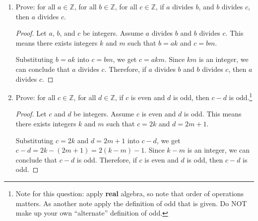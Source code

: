 \documentclass{article}
\begin{document}
\begin{enumerate}
\newpage

\item Prove: for all $a \in \mathbb{Z}$, for all $b \in \mathbb{Z}$, for all $c \in \mathbb{Z}$, if $a$ divides $b$, and $b$ divides $c$, then $a$ divides $c$.

\begin{proof}
    Let $a$, $b$, and $c$ be integers. Assume $a$ divides $b$ and $b$ divides $c$. This means there exists integers $k$ and $m$ such that $b = ak$ and $c = bm$.

    Substituting $b = ak$ into $c = bm$, we get $c = akm$. Since $km$ is an integer, we can conclude that $a$ divides $c$. Therefore, if $a$ divides $b$ and $b$ divides $c$, then $a$ divides $c$.
\end{proof}

\newpage

\item Prove: for all $c \in \mathbb{Z}$, for all $d \in \mathbb{Z}$, if $c$ is even and $d$ is odd, then $c-d$ is odd.\footnote{Note for this question: apply {\bf real} algebra, so note that order of operations matters. As another note apply the definition of odd that is given. Do NOT make up your own ``alternate'' definition of odd.}

\begin{proof}
    Let $c$ and $d$ be integers. Assume $c$ is even and $d$ is odd. This means there exists integers $k$ and $m$ such that $c = 2k$ and $d = 2m + 1$.

    Substituting $c = 2k$ and $d = 2m + 1$ into $c - d$, we get $c - d = 2k - (2m + 1) = 2(k - m) - 1$. Since $k - m$ is an integer, we can conclude that $c - d$ is odd. Therefore, if $c$ is even and $d$ is odd, then $c - d$ is odd.
\end{proof}

\newpage


\end{enumerate}
\end{document}
